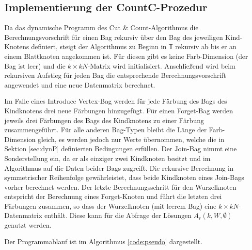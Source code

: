\subsection{Implementierung der CountC-Prozedur}
\label{ssec:impl_countc}
Da das dynamische Programm des Cut \& Count-Algorithmus die Berechnungsvorschrift für einen Bag rekursiv über den Bag des jeweiligen Kind-Knotens definiert, steigt der Algorithmus zu Beginn in $\mathbb{T}$ rekursiv ab bis er an einem Blattknoten angekommen ist. 
Für diesen gibt es keine Farb-Dimension (der Bag ist leer) und die $k \times kN$-Matrix wird initialisiert. 
Anschließend wird beim rekursiven Aufstieg für jeden Bag die entsprechende Berechnungsvorschrift angewendet und eine neue Datenmatrix berechnet. 

Im Falle eines \glqq Introduce Vertex\grqq -Bag werden für jede Färbung des Bags des Kindknotens drei neue Färbungen hinzugefügt.
Für einen \glqq Forget\grqq -Bag werden jeweils drei Färbungen des Bags des Kindknotens zu einer Färbung zusammengeführt.
Für alle anderen Bag-Typen bleibt die Länge der Farb-Dimension gleich, es werden jedoch nur Werte übernommen, welche die in Sektion \ref{sec:dynP} definierten Bedingungen erfüllen. 
Der \glqq Join\grqq -Bag nimmt eine Sonderstellung ein, da er als einziger zwei Kindknoten besitzt und im Algorithmus auf die Daten beider Bags zugreift. 
Die rekursive Berechnung in symmetrischer Reihenfolge gewährleistet, dass beide Kindknoten eines \glqq Join\grqq -Bags vorher berechnet werden. 
Der letzte Berechnungsschritt für den Wurzelknoten entspricht der Berechnung eines \glqq Forget\grqq -Knoten und führt die letzten drei Färbungen zusammen, so dass der Wurzelknoten (mit leerem Bag) eine $k \times kN$-Datenmatrix enthält. 
Diese kann für die Abfrage der Lösungen $A_r(k,W,\emptyset)$ genutzt werden.

Der Programmablauf ist im Algorithmus \ref{code:pseudo} dargestellt.


